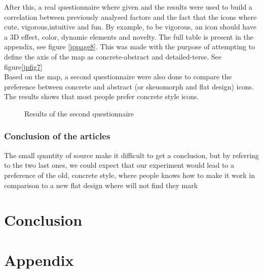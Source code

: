\documentclass[a4paper,11pt] {article}
\theoremstyle{definition}
\begin{document}
After this, a real questionnaire where given and the results were used to build a correlation between previously analysed factors and the fact that the icons where cute, vigorous,intuitive and fun. By example, to be vigorous, an icon should have a 3D effect, color, dynamic elements and novelty. The full table is present in the appendix, see figure \ref{jppage8}. This was made with the purpose of attempting to define the axis of the map as concrete-abstract and detailed-terse. See figure\ref{jpfig7}
\\
Based on the map, a second questionnaire were also done to compare the preference between concrete and abstract (or skeuomorph and flat design) icons. The results shows that most people prefer concrete style icons.
\begin{figure}[H]
  \caption{Results of the second questionnaire}\label{jppage10}
\end{figure}
    \subsubsection{Conclusion of the articles}
        The small quantity of source make it difficult to get a conclusion, but by referring to the two last ones, we could expect that our experiment would lead to a preference of the old, concrete style, where people knows how to make it work in comparison to a new flat design where will not find they mark
\section{Conclusion}

\newpage
\section{Appendix}
\end{document}

